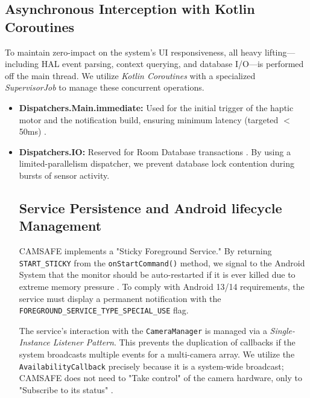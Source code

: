 \documentclass[12pt,a4paper]{report}
\begin{document}
\begin{enumerate}
    \subsection{Asynchronous Interception with Kotlin Coroutines}
    To maintain zero-impact on the system's UI responsiveness, all heavy lifting—including HAL event parsing, context querying, and database I/O—is performed off the main thread. We utilize \textit{Kotlin Coroutines} with a specialized \textit{SupervisorJob} to manage these concurrent operations.
    \begin{itemize}
        \item \textbf{Dispatchers.Main.immediate:} Used for the initial trigger of the haptic motor and the notification build, ensuring minimum latency (targeted $<$ 50ms) \cite{androidhal}.
        \item \textbf{Dispatchers.IO:} Reserved for Room Database transactions \cite{smarthome}. By using a limited-parallelism dispatcher, we prevent database lock contention during bursts of sensor activity.
       

    \subsection{Service Persistence and Android lifecycle Management}
    CAMSAFE implements a "Sticky Foreground Service." By returning \texttt{START\_STICKY} from the \texttt{onStartCommand()} method, we signal to the Android System that the monitor should be auto-restarted if it is ever killed due to extreme memory pressure \cite{androidhal}. To comply with Android 13/14 requirements, the service must display a permanent notification with the \texttt{FOREGROUND\_SERVICE\_TYPE\_\allowbreak{}SPECIAL\_USE} flag.

    The service's interaction with the \texttt{CameraManager} is managed via a \textit{Single-Instance Listener Pattern}. This prevents the duplication of callbacks if the system broadcasts multiple events for a multi-camera array. We utilize the \texttt{AvailabilityCallback} precisely because it is a system-wide broadcast; CAMSAFE does not need to "Take control" of the camera hardware, only to "Subscribe to its status" \cite{androidhal}.


\end{itemize}
\end{enumerate}
\end{document}
